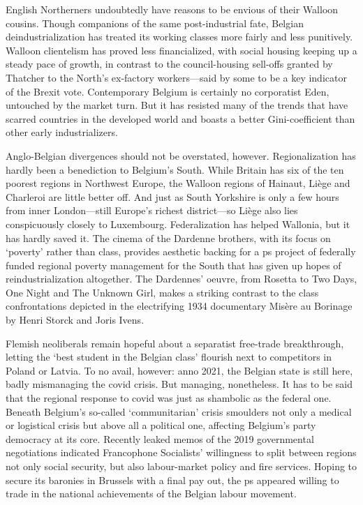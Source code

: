 \documentclass[
]{book}
\begin{document}
English Northerners undoubtedly have reasons to be envious of their Walloon cousins. Though companions of the same post-industrial fate, Belgian deindustrialization has treated its working classes more fairly and less punitively. Walloon clientelism has proved less financialized, with social housing keeping up a steady pace of growth, in contrast to the council-housing sell-offs granted by Thatcher to the North's ex-factory workers---said by some to be a key indicator of the Brexit vote. Contemporary Belgium is certainly no corporatist Eden, untouched by the market turn. But it has resisted many of the trends that have scarred countries in the developed world and boasts a better Gini-coefficient than other early industrializers.

Anglo-Belgian divergences should not be overstated, however. Regionalization has hardly been a benediction to Belgium's South. While Britain has six of the ten poorest regions in Northwest Europe, the Walloon regions of Hainaut, Liège and Charleroi are little better off. And just as South Yorkshire is only a few hours from inner London---still Europe's richest district---so Liège also lies conspicuously closely to Luxembourg. Federalization has helped Wallonia, but it has hardly saved it. The cinema of the Dardenne brothers, with its focus on `poverty' rather than class, provides aesthetic backing for a ps project of federally funded regional poverty management for the South that has given up hopes of reindustrialization altogether. The Dardennes' oeuvre, from Rosetta to Two Days, One Night and The Unknown Girl, makes a striking contrast to the class confrontations depicted in the electrifying 1934 documentary Misère au Borinage by Henri Storck and Joris Ivens.

Flemish neoliberals remain hopeful about a separatist free-trade breakthrough, letting the `best student in the Belgian class' flourish next to competitors in Poland or Latvia. To no avail, however: anno 2021, the Belgian state is still here, badly mismanaging the covid crisis. But managing, nonetheless. It has to be said that the regional response to covid was just as shambolic as the federal one. Beneath Belgium's so-called `communitarian' crisis smoulders not only a medical or logistical crisis but above all a political one, affecting Belgium's party democracy at its core. Recently leaked memos of the 2019 governmental negotiations indicated Francophone Socialists' willingness to split between regions not only social security, but also labour-market policy and fire services. Hoping to secure its baronies in Brussels with a final pay out, the ps appeared willing to trade in the national achievements of the Belgian labour movement.
\end{document}
